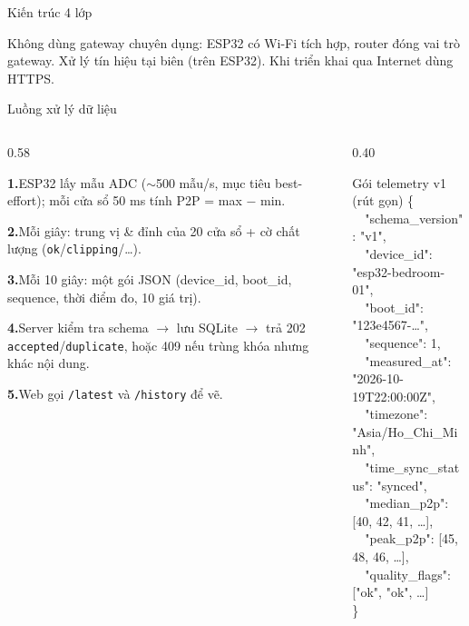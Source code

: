 \documentclass[t, aspectratio=169]{beamer}
\newcommand{\step}[2]{\par\noindent\hangindent=0.55cm\hangafter=1 {\color{hustprimary}\textbf{#1}}\hspace{0.15cm}#2\par\vspace{1.6mm}}
\begin{document}
\begin{frame}{Kiến trúc 4 lớp}
  \vspace{0.2cm}
  \begin{minipage}{0.95\textwidth}
    \footnotesize\raggedright
    Không dùng gateway chuyên dụng: ESP32 có Wi-Fi tích hợp, router đóng vai trò gateway. Xử lý tín hiệu tại biên (trên ESP32). Khi triển khai qua Internet dùng HTTPS.
  \end{minipage}
\end{frame}

\begin{frame}{Luồng xử lý dữ liệu}
  \footnotesize
  \begin{columns}[T]
    \begin{column}{0.58\textwidth}
      \step{1.}{ESP32 lấy mẫu ADC ($\sim$500 mẫu/s, mục tiêu best-effort); mỗi cửa sổ 50 ms tính P2P = max $-$ min.}
      \step{2.}{Mỗi giây: trung vị \& đỉnh của 20 cửa sổ + cờ chất lượng (\texttt{ok}/\texttt{clipping}/\dots).}
      \step{3.}{Mỗi 10 giây: một gói JSON (device\_id, boot\_id, sequence, thời điểm đo, 10 giá trị).}
      \step{4.}{Server kiểm tra schema $\rightarrow$ lưu SQLite $\rightarrow$ trả 202 \texttt{accepted}/\texttt{duplicate}, hoặc 409 nếu trùng khóa nhưng khác nội dung.}
      \step{5.}{Web gọi \texttt{/latest} và \texttt{/history} để vẽ.}
    \end{column}
    \begin{column}{0.40\textwidth}
      \begin{block}{Gói telemetry v1 (rút gọn)}
        \ttfamily\fontsize{6.6}{8.4}\selectfont
        \{\\
        \ \ "schema\_version": "v1",\\
        \ \ "device\_id": "esp32-bedroom-01",\\
        \ \ "boot\_id": "123e4567-…",\\
        \ \ "sequence": 1,\\
        \ \ "measured\_at": "2026-10-19T22:00:00Z",\\
        \ \ "timezone": "Asia/Ho\_Chi\_Minh",\\
        \ \ "time\_sync\_status": "synced",\\
        \ \ "median\_p2p": [40, 42, 41, …],\\
        \ \ "peak\_p2p": [45, 48, 46, …],\\
        \ \ "quality\_flags": ["ok", "ok", …]\\
        \}
      \end{block}
    \end{column}
  \end{columns}
\end{frame}
\end{document}
